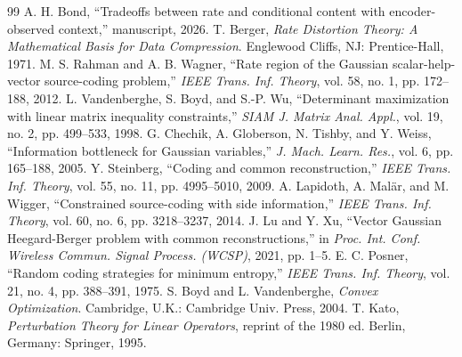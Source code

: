\documentclass[11pt,onecolumn]{IEEEtran}
\begin{document}
\begin{thebibliography}{99}
 A. H. Bond, ``Tradeoffs between rate and conditional
content with encoder-observed context,'' manuscript, 2026.
 T. Berger, \emph{Rate Distortion Theory: A Mathematical
Basis for Data Compression}. Englewood Cliffs, NJ: Prentice-Hall, 1971.
 M. S. Rahman and A. B. Wagner, ``Rate region of the Gaussian
scalar-help-vector source-coding problem,'' \emph{IEEE Trans. Inf. Theory},
vol. 58, no. 1, pp. 172--188, 2012.
 L. Vandenberghe, S. Boyd, and S.-P. Wu, ``Determinant
maximization with linear matrix inequality constraints,'' \emph{SIAM J.
Matrix Anal. Appl.}, vol. 19, no. 2, pp. 499--533, 1998.
 G. Chechik, A. Globerson, N. Tishby, and Y. Weiss,
``Information bottleneck for Gaussian variables,'' \emph{J. Mach. Learn.
Res.}, vol. 6, pp. 165--188, 2005.
 Y. Steinberg, ``Coding and common reconstruction,''
\emph{IEEE Trans. Inf. Theory}, vol. 55, no. 11, pp. 4995--5010, 2009.
 A. Lapidoth, A. Mal\"ar, and M. Wigger, ``Constrained
source-coding with side information,'' \emph{IEEE Trans. Inf. Theory},
vol. 60, no. 6, pp. 3218--3237, 2014.
 J. Lu and Y. Xu, ``Vector Gaussian Heegard-Berger problem
with common reconstructions,'' in \emph{Proc. Int. Conf. Wireless Commun. Signal
Process. (WCSP)}, 2021, pp. 1--5.
 E. C. Posner, ``Random coding strategies for minimum
entropy,'' \emph{IEEE Trans. Inf. Theory}, vol. 21, no. 4, pp. 388--391,
1975.
 S. Boyd and L. Vandenberghe, \emph{Convex Optimization}.
Cambridge, U.K.: Cambridge Univ. Press, 2004.
 T. Kato, \emph{Perturbation Theory for Linear Operators},
reprint of the 1980 ed. Berlin, Germany: Springer, 1995.
\end{thebibliography}
\end{document}
